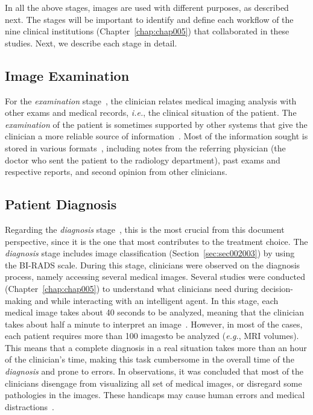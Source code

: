 In all the above stages, images are used with different purposes, as described next.
The stages will be important to identify and define each workflow of the nine clinical institutions (Chapter~\ref{chap:chap005}) that collaborated in these studies.
Next, we describe each stage in detail.

\subsection{Image Examination}
\label{sec:sec002005001}

For the {\it examination} stage~\cite{8621479}, the clinician relates medical imaging analysis with other exams and medical records, {\it i.e.}, the clinical situation of the patient.
The {\it examination} of the patient is sometimes supported by other systems that give the clinician a more reliable source of information~\cite{islam2018recent, DIROBERTO2016950}.
Most of the information sought is stored in various formats~\cite{GIBSON2018113}, including notes from the referring physician (the doctor who sent the patient to the radiology department), past exams and respective reports, and second opinion from other clinicians.

\subsection{Patient Diagnosis}
\label{sec:sec002005002}

Regarding the {\it diagnosis} stage~\cite{https://doi.org/10.1002/cncr.32872}, this is the most crucial from this document perspective, since it is the one that most contributes to the treatment choice.
The {\it diagnosis} stage includes image classification (Section~\ref{sec:sec002003}) by using the \ac{BI-RADS} scale.
During this stage, clinicians were observed on the diagnosis process, namely accessing several medical images.
Several studies were conducted (Chapter~\ref{chap:chap005}) to understand what clinicians need during decision-making and while interacting with an intelligent agent.
In this stage, each medical image takes about 40 seconds to be analyzed, meaning that the clinician takes about half a minute to interpret an image~\cite{jiang2018interpretation}.
However, in most of the cases, each patient requires more than 100 images\footnotemark[6] to be analyzed ({\it e.g.}, MRI volumes).
This means that a complete diagnosis in a real situation takes more than an hour of the clinician's time, making this task cumbersome in the overall time of the {\it diagnosis} and prone to errors.
In observations, it was concluded that most of the clinicians disengage from visualizing all set of medical images, or disregard some pathologies in the images.
These handicaps may cause human errors and medical distractions~\cite{bruno2015understanding}.

